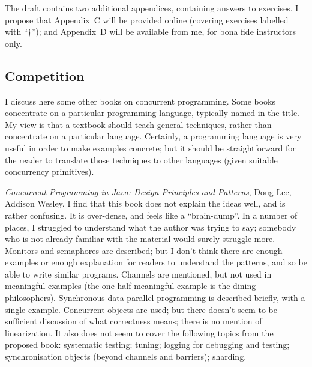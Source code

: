 \documentclass[12pt,a4paper]{article}
\begin{document}

The draft contains two additional appendices, containing answers to exercises.
I propose that Appendix~C will be provided online (covering exercises labelled
with ``$\dag$''); and Appendix~D will be available from me, for bona fide
instructors only.



\subsection*{Competition}

I discuss here some other books on concurrent programming.
%
Some books concentrate on a particular programming language, typically named
in the title.  My view is that a textbook should teach general techniques,
rather than concentrate on a particular language.  Certainly, a programming
language is very useful in order to make examples concrete; but it should be
straightforward for the reader to translate those techniques to other
languages (given suitable concurrency primitives).

\emph{Concurrent Programming in Java: Design Principles and Patterns}, Doug
Lee, Addison Wesley.
%
I find that this book does not explain the ideas well, and is rather
confusing.  It is over-dense, and feels like a ``brain-dump''.
In a number of places, I struggled to
understand what the author was trying to say; somebody who is not already
familiar with the material would surely struggle more.
%
Monitors and semaphores are described; but I don't think there are enough
examples or enough explanation for readers to understand the patterns, and so
be able to write similar programs. 
%
Channels are mentioned, but not used in meaningful examples (the one
half-meaningful example is the dining philosophers).  
Synchronous data parallel programming is described briefly, with a single
example. 
Concurrent objects are used; but there doesn't seem to be sufficient
discussion of what correctness means; there is no mention of linearization.
% 
It also does not seem to cover the following topics from the proposed book:
systematic testing; tuning; logging for debugging and testing; synchronisation
objects (beyond channels and barriers); sharding.
\end{document}
